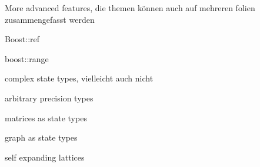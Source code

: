 \begin{frame}
 More advanced features, die themen können auch auf mehreren folien zusammengefasst werden
\end{frame}


\begin{frame}
 Boost::ref
\end{frame}

\begin{frame}
 boost::range
\end{frame}

\begin{frame}
 complex state types, vielleicht auch nicht
\end{frame}

\begin{frame}
 arbitrary precision types
\end{frame}

\begin{frame}
 matrices as state types
\end{frame}

\begin{frame}
 graph as state types
\end{frame}

\begin{frame}
 self expanding lattices
\end{frame}









